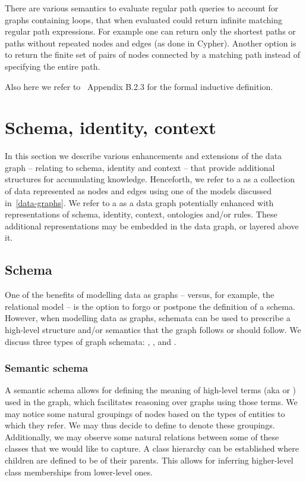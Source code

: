 There are various semantics to evaluate regular path queries to account for graphs containing loops, that when evaluated could return infinite matching regular path expressions. For example one can return only the shortest paths or paths without repeated nodes and edges (as done in Cypher). Another option is to return the finite set of pairs of nodes connected by a matching path instead of specifying the entire path.

Also here we refer to~\cite{Angles2017FoundationmodernQueryLnguagesforGraphDatabases} Appendix B.2.3 for the formal inductive definition.

\section{Schema, identity, context}\label{schema-identity-context}
In this section we describe various enhancements and extensions of the data graph – relating to schema, identity and context – that provide additional structures for accumulating knowledge. Henceforth, we refer to a  as a collection of data represented as nodes and edges using one of the models discussed in~\ref{data-graphs}. We refer to a  as a data graph potentially enhanced with representations of schema, identity, context, ontologies and/or rules. These additional representations may be embedded in the data graph, or layered above it.

\subsection{Schema}\label{schema}
One of the benefits of modelling data as graphs – versus, for example, the relational model – is the option to forgo or postpone the definition of a schema. However, when modelling data as graphs, schemata can be used to prescribe a high-level structure and/or semantics that the graph follows or should follow. We discuss three types of graph schemata: , , and .

\subsubsection{Semantic schema}
A semantic schema allows for defining the meaning of high-level terms (aka  or ) used in the graph, which facilitates reasoning over graphs using those terms. We may notice some natural groupings of nodes based on the types of entities to which they refer. We may thus decide to define  to denote these groupings. Additionally, we may observe some natural relations between some of these classes that we would like to capture. A class hierarchy can be established where children are defined to be  of their parents. This allows for inferring higher-level class memberships from lower-level ones.

